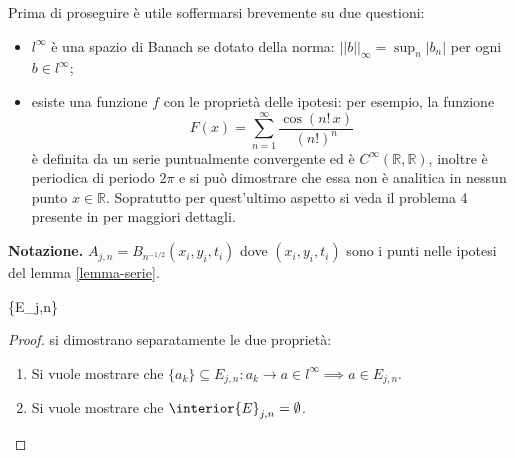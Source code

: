 \begin{example}
\begin{remark}
Prima di proseguire è utile soffermarsi brevemente su due questioni:
\begin{itemize}
\item
$l^{\infty}$ è una spazio di Banach se dotato della norma: $||b||_\infty=\sup_n|b_n|$ per ogni $b \in l^{\infty}$;
\item
esiste una funzione $f$ con le proprietà delle ipotesi: per esempio, la funzione $$F(x)=\sum_{n=1}^\infty\frac{\cos(n!\,x)}{(n!)^n}$$ è definita da un serie puntualmente convergente ed è $C^{\infty}(\mathbb{R},\mathbb{R})$, inoltre è periodica di periodo $2\pi$ e si può dimostrare che essa non è analitica in nessun punto $x\in\mathbb{R}$. Sopratutto per quest'ultimo aspetto si veda il problema 4 presente in \cite[cap.3]{John} per maggiori dettagli.
\end{itemize}
\end{remark}
\textbf{Notazione.} $A_{j,n} = B_{n^{-1/2}}(x_i,y_i,t_i)$ dove $(x_i,y_i,t_i)$ sono i punti nelle ipotesi del lemma \ref{lemma-serie}.
\begin{lemma}\label{lemma-e}
{\{E_{j,n}\} }
\end{lemma}

\begin{proof} 
si dimostrano separatamente le due proprietà:
\begin{enumerate}
\item
Si vuole mostrare che $\{a_k\}\subseteq E_{j,n} : a_k \rightarrow a \in l^\infty \implies a \in E_{j,n}$.
\item
Si vuole mostrare che $\interior{E}_{j,n}=\emptyset$.
\end{enumerate}


\end{proof}
\end{example}
